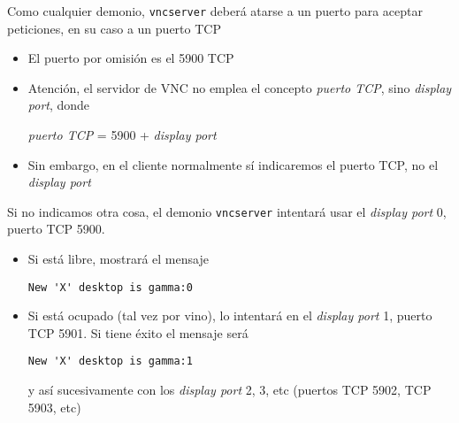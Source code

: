 \documentclass[ucs]{beamer}
\begin{document}
\begin{frame}[fragile]
\frametitle{}


Como cualquier demonio,
\verb|vncserver|
deberá atarse a un puerto para aceptar peticiones, en su caso a un puerto TCP 

\begin{itemize}
\item
El puerto por omisión es el 5900 TCP

\item
Atención, el servidor de VNC no emplea el concepto \emph{puerto TCP}, 
sino 
\emph{display port}, donde

\emph{puerto TCP} = 5900 + \emph{display port} 

\item
Sin embargo, en el cliente normalmente sí indicaremos el puerto TCP, no el
\emph{display  port}

\end{itemize}


\end{frame}
\begin{frame}[fragile]


Si no indicamos otra cosa, el demonio
\verb|vncserver|
 intentará usar el
\emph{display port} 0, puerto TCP  5900.
\begin{itemize}
\item

Si está libre, mostrará el mensaje
\begin{scriptsize}
\begin{verbatim}
New 'X' desktop is gamma:0
\end{verbatim}
\end{scriptsize}


\item
Si está ocupado (tal vez por vino), lo intentará en el
\emph{display port} 1,  puerto TCP
 5901. Si 
tiene éxito el mensaje será

\begin{scriptsize}
\begin{verbatim}
New 'X' desktop is gamma:1
\end{verbatim}
\end{scriptsize}

y así sucesivamente con los
\emph{display port} 2, 3, etc
(puertos TCP 5902, TCP 5903, etc)

\end{itemize}

\end{frame}
\end{document}
